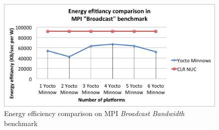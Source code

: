 \begin{figure}[H]
\centering
\includegraphics[width=1 \textwidth]{images/energy_results/broadcast.png}
\caption{Energy efficiency comparison on MPI \textit{Broadcast Bandwidth} benchmark}
\label{broadcast_energy}
\end{figure}


\clearpage
